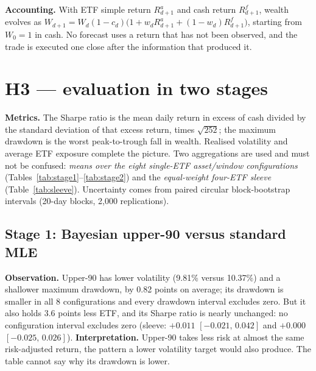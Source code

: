 \documentclass[11pt]{article}
\begin{document}
\textbf{Accounting.} With ETF simple return $R^a_{d+1}$ and cash return $R^f_{d+1}$, wealth evolves as
$W_{d+1}=W_d(1-c_d)\bigl(1+w_dR^a_{d+1}+(1-w_d)R^f_{d+1}\bigr)$, starting from $W_0=1$ in cash. No forecast uses a
return that has not been observed, and the trade is executed one close after the information that produced it.

\section{H3 --- evaluation in two stages}
\textbf{Metrics.} The Sharpe ratio is the mean daily return in excess of cash divided by the standard deviation of
that excess return, times $\sqrt{252}$; the maximum drawdown is the worst peak-to-trough fall in wealth. Realised
volatility and average ETF exposure complete the picture. Two aggregations are used and must not be confused:
\emph{means over the eight single-ETF asset/window configurations} (Tables~\ref{tab:stage1}--\ref{tab:stage2}) and the
\emph{equal-weight four-ETF sleeve} (Table~\ref{tab:sleeve}). Uncertainty comes from paired circular block-bootstrap
intervals \cite{politis1992} (20-day blocks, 2{,}000 replications).

\subsection{Stage 1: Bayesian upper-90 versus standard MLE}
\begin{table}[h]\centering\small
\resizebox{.92\textwidth}{!}{}
\caption{Stage 1, 2017--22: means over the 8 single-ETF configurations, 5 bp costs. The last row counts configurations
whose paired 95\% interval for the difference excludes zero.}\label{tab:stage1}
\end{table}

\textbf{Observation.} Upper-90 has lower volatility (9.81\% versus 10.37\%) and a shallower maximum drawdown, by 0.82
points on average; its drawdown is smaller in all 8 configurations and every drawdown interval excludes zero. But it
also holds 3.6 points less ETF, and its Sharpe ratio is nearly unchanged: no configuration interval excludes zero
(sleeve: $+0.011$ $[-0.021,\,0.042]$ and $+0.000$ $[-0.025,\,0.026]$).
\textbf{Interpretation.} Upper-90 takes less risk at almost the same risk-adjusted return, the pattern a lower
volatility target would also produce. The table cannot say why its drawdown is lower.
\end{document}
